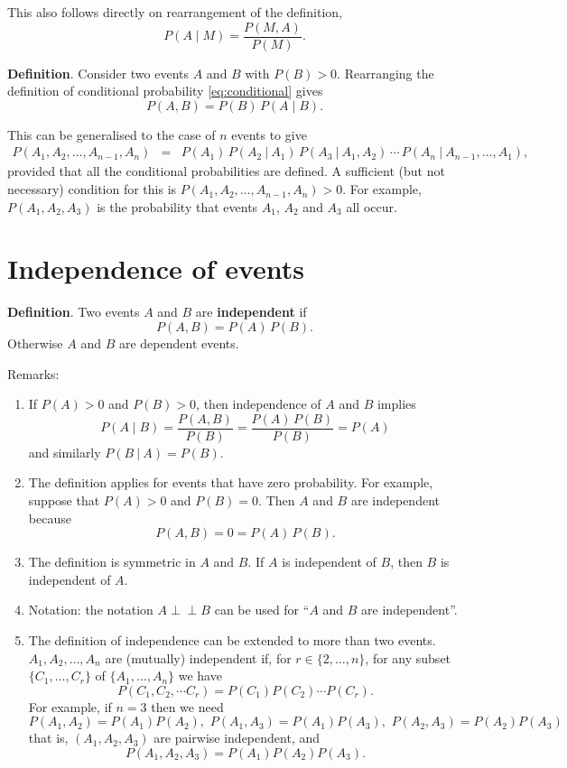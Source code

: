 \documentclass[
  11pt,
  british,
  openany, a4paper]{book}
\providecommand{\tightlist}{%
  \setlength{\itemsep}{0pt}\setlength{\parskip}{0pt}}
\begin{document}
This also follows directly on rearrangement of the definition,
\[ P(A \mid M) = \frac{P(M , A)}{P(M)}. \]

\textbf{Definition}. Consider two events \(A\) and \(B\) with \(P(B)>0\). Rearranging the definition of conditional probability \eqref{eq:conditional} gives
\begin{equation}
P(A , B) = P(B)\,P(A \mid B).  
\label{eq:mult}
\end{equation}

This can be generalised to the case of \(n\) events to give
\begin{eqnarray}
P(A_1, A_2,\ldots, A_{n-1}, A_n) &=&
P(A_1)\,P(A_2~|~A_1)\,P(A_3~|~A_1,A_2)\,\cdots\,P(A_n~|~A_{n-1},\ldots,A_1),
\end{eqnarray}
provided that all the conditional probabilities are defined. A sufficient (but not necessary) condition for this is \(P(A_1, A_2, \ldots, A_{n-1}, A_n)>0\). For example, \(P(A_1, A_2, A_3)\) is the probability that events \(A_1\), \(A_2\) and \(A_3\) all occur.

\hypertarget{indepevents}{%
\section{Independence of events}\label{indepevents}}

\textbf{Definition}. Two events \(A\) and \(B\) are \textbf{independent} if
\begin{equation}
P(A , B) = P(A) \,P(B).  
\label{eq:indep}
\end{equation}
Otherwise \(A\) and \(B\) are dependent events.

Remarks:

\begin{enumerate}
\def\labelenumi{\arabic{enumi}.}
\tightlist
\item
  If \(P(A) > 0\) and \(P(B) > 0\), then independence of \(A\) and \(B\) implies
  \[ P(A \mid B) = \frac{P(A , B)}{P(B)} = \frac{P(A)\,P(B)}{P(B)} = P(A) \]
  and similarly \(P(B~|~A)=P(B)\).
\item
  The definition applies for events that have zero probability. For example, suppose that \(P(A)>0\) and \(P(B)=0\). Then \(A\) and \(B\) are independent because
  \[ P(A , B) = 0 = P(A)\,P(B). \]
\item
  The definition is symmetric in \(A\) and \(B\). If \(A\) is independent of \(B\), then \(B\) is independent of \(A\).
\item
  Notation: the notation \(A \perp \!\!\! \perp B\) can be used for ``\(A\) and \(B\) are independent''.
\item
  The definition of independence can be extended to more than two events.
  \(A_1, A_2, \ldots, A_n\) are (mutually) independent if, for \(r \in \{2, \ldots, n\}\), for any subset \(\{ C_1, \ldots, C_r \}\) of \(\{ A_1, \ldots, A_n\}\) we have
  \[ P(C_{1} , C_{2} , \cdots C_{r}) = P(C_{1}) P(C_{2}) \cdots P(C_{r}). \]
  For example, if \(n = 3\) then we need
  \[ P(A_{1} , A_{2}) = P(A_1) P(A_2), \,\, P(A_{1} , A_{3}) = P(A_1) P(A_3), \,\, P(A_{2} , A_{3}) = P(A_2) P(A_3) \]
  that is, \((A_1, A_2, A_3)\) are pairwise independent, and
  \[ P(A_{1} , A_{2} , A_{3}) = P(A_{1}) P(A_{2}) P(A_{3}). \]
\end{enumerate}
\end{document}
